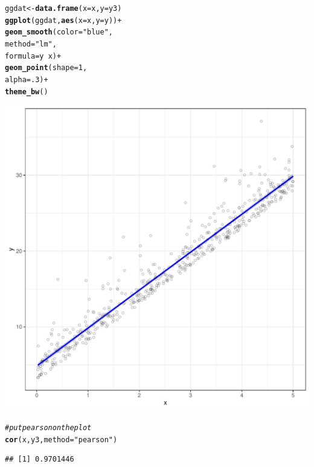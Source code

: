 \documentclass{article}\usepackage[]{graphicx}\usepackage[]{color}
\makeatletter
\def\maxwidth{ %
  \ifdim\Gin@nat@width>\linewidth
    \linewidth
  \else
    \Gin@nat@width
  \fi
}
\newcommand{\hlnum}[1]{\textcolor[rgb]{0.686,0.059,0.569}{#1}}%
\newcommand{\hlstr}[1]{\textcolor[rgb]{0.192,0.494,0.8}{#1}}%
\newcommand{\hlcom}[1]{\textcolor[rgb]{0.678,0.584,0.686}{\textit{#1}}}%
\newcommand{\hlopt}[1]{\textcolor[rgb]{0,0,0}{#1}}%
\newcommand{\hlstd}[1]{\textcolor[rgb]{0.345,0.345,0.345}{#1}}%
\newcommand{\hlkwb}[1]{\textcolor[rgb]{0.69,0.353,0.396}{#1}}%
\newcommand{\hlkwc}[1]{\textcolor[rgb]{0.333,0.667,0.333}{#1}}%
\newcommand{\hlkwd}[1]{\textcolor[rgb]{0.737,0.353,0.396}{\textbf{#1}}}%
\newenvironment{kframe}{%
 \def\at@end@of@kframe{}%
 \ifinner\ifhmode%
  \def\at@end@of@kframe{\end{minipage}}%
  \begin{minipage}{\columnwidth}%
 \fi\fi%
 \def\FrameCommand##1{\hskip\@totalleftmargin \hskip-\fboxsep
 \colorbox{shadecolor}{##1}\hskip-\fboxsep
     \hskip-\linewidth \hskip-\@totalleftmargin \hskip\columnwidth}%
 \MakeFramed {\advance\hsize-\width
   \@totalleftmargin\z@ \linewidth\hsize
   \@setminipage}}%
 {\par\unskip\endMakeFramed%
 \at@end@of@kframe}
\newenvironment{knitrout}{}{} %
\makeatother
\begin{document}
\begin{enumerate}
\begin{enumerate}
\begin{knitrout}
\begin{kframe}
\begin{alltt}
\hlstd{ggdat}\hlkwb{<-}\hlkwd{data.frame}\hlstd{(}\hlkwc{x}\hlstd{=x,} \hlkwc{y}\hlstd{=y3)}
\hlkwd{ggplot}\hlstd{(ggdat,} \hlkwd{aes}\hlstd{(}\hlkwc{x}\hlstd{=x,} \hlkwc{y}\hlstd{=y))}\hlopt{+}
  \hlkwd{geom_smooth}\hlstd{(}\hlkwc{color}\hlstd{=}\hlstr{"blue"}\hlstd{,}
              \hlkwc{method}\hlstd{=}\hlstr{"lm"}\hlstd{,}
              \hlkwc{formula}\hlstd{=y}\hlopt{~}\hlstd{x)}\hlopt{+}
  \hlkwd{geom_point}\hlstd{(}\hlkwc{shape}\hlstd{=}\hlnum{1}\hlstd{,}
             \hlkwc{alpha}\hlstd{=}\hlnum{.3}\hlstd{)}\hlopt{+}
  \hlkwd{theme_bw}\hlstd{()}
\end{alltt}
\end{kframe}
\includegraphics[width=\maxwidth]{figure/unnamed-chunk-16-1} 
\begin{kframe}\begin{alltt}
  \hlcom{#put pearson on the plot}
\hlkwd{cor}\hlstd{(x, y3,} \hlkwc{method}\hlstd{=}\hlstr{"pearson"}\hlstd{)}
\end{alltt}
\begin{verbatim}
## [1] 0.9701446
\end{verbatim}
\end{kframe}
\end{knitrout}


\end{enumerate}
\end{enumerate}
\end{document}
